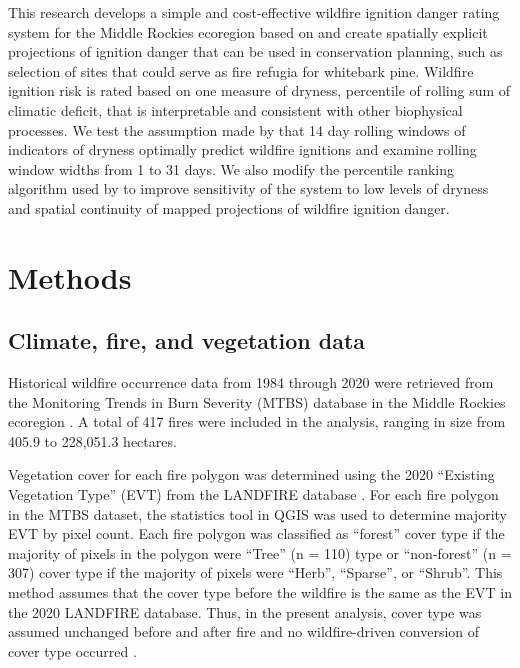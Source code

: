 \documentclass[11p]{article}
\begin{document}
This research develops a simple and cost-effective wildfire ignition danger rating system for the Middle Rockies ecoregion based on \citet{thomaWaterBalanceIndicator2020} and create spatially explicit projections of ignition danger that can be used in conservation planning, such as selection of sites that could serve as fire refugia for whitebark pine. Wildfire ignition risk is rated based on one measure of dryness, percentile of rolling sum of climatic deficit, that is interpretable and consistent with other biophysical processes. We test the assumption made by \citet{thomaWaterBalanceIndicator2020} that 14 day rolling windows of indicators of dryness optimally predict wildfire ignitions and examine rolling window widths from 1 to 31 days. We also modify the percentile ranking algorithm used by \citet{thomaWaterBalanceIndicator2020} to improve sensitivity of the system to low levels of dryness and spatial continuity of mapped projections of wildfire ignition danger. 

\section{Methods}

\subsection{Climate, fire, and vegetation data}

Historical wildfire occurrence data from 1984 through 2020 were retrieved from the Monitoring Trends in Burn Severity (MTBS) database \citep{eidenshinkProjectMonitoringTrends2007} in the Middle Rockies ecoregion \citep{omernikEcoregionsConterminousUnited1987}. A total of 417 fires were included in the analysis, ranging in size from 405.9 to 228,051.3 hectares.

Vegetation cover for each fire polygon was determined using the 2020 ``Existing Vegetation Type'' (EVT) from the LANDFIRE database \citep{rollinsLANDFIRENationallyConsistent2009}. For each fire polygon in the MTBS dataset, the statistics tool in QGIS \citep{QGIS_software} was used to determine majority EVT by pixel count. Each fire polygon was classified as ``forest'' cover type if the majority of pixels in the polygon were ``Tree'' (n = 110) type or ``non-forest'' (n = 307) cover type if the majority of pixels were ``Herb'', ``Sparse'', or ``Shrub''. This method assumes that the cover type before the wildfire is the same as the EVT in the 2020 LANDFIRE database. Thus, in the present analysis, cover type was assumed unchanged before and after fire and no wildfire-driven conversion of cover type occurred \citep{coopWildfireDrivenForestConversion2020}.
\end{document}
